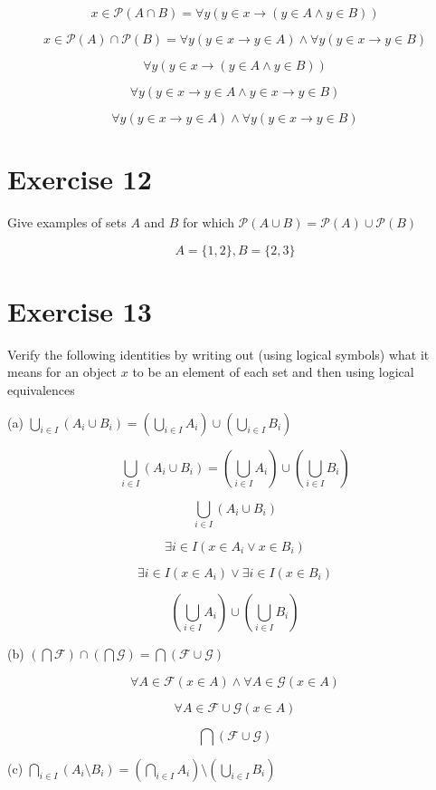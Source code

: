 \documentclass[11pt]{article}
\newcommand{\then}{\rightarrow}
\newcommand{\powerset}[1]{\mathscr{P}(#1)}
\newcommand{\family}{\mathcal{F}}
\begin{document}
$$x \in \powerset{A \cap B} = \forall y (y \in x \then (y \in A \wedge y \in B))$$

$$x \in \powerset{A} \cap \powerset{B} = 
\forall y (y \in x \then y \in A) \wedge \forall y (y \in x \then y \in B)$$

$$\forall y (y \in x \then (y \in A \wedge y \in B))$$

$$\forall y (y \in x \then y \in A \wedge y \in x \then y \in B)$$

$$\forall y (y \in x \then y \in A) \wedge \forall y (y \in x \then y \in B)$$

\section*{Exercise 12} 

Give examples of sets $A$ and $B$ for which 
$\powerset{A \cup B} = \powerset{A} \cup \powerset{B}$

$$A = \{1, 2\}, B = \{2 ,3\}$$

\section*{Exercise 13}

Verify the following identities by writing out (using logical symbols) what it 
means for an object $x$ to be an element of each set and then using logical 
equivalences

\noindent (a) $\bigcup_{i \in I} (A_i \cup B_i) = 
(\bigcup_{i \in I} A_i) \cup (\bigcup_{i \in I} B_i)$

$$\bigcup_{i \in I} (A_i \cup B_i) = 
(\bigcup_{i \in I} A_i) \cup (\bigcup_{i \in I} B_i)$$

$$\bigcup_{i \in I} (A_i \cup B_i)$$

$$\exists i \in I (x \in A_i \vee x \in B_i)$$

$$\exists i \in I (x \in A_i) \vee \exists i \in I (x \in B_i)$$

$$(\bigcup_{i \in I} A_i) \cup (\bigcup_{i \in I} B_i)$$

\noindent (b) $(\bigcap \family) \cap (\bigcap \mathcal{G}) = 
\bigcap (\family \cup \mathcal{G})$

$$\forall A \in \family (x \in A) \wedge \forall A \in \mathcal{G} (x \in A)$$

$$\forall A \in \family \cup \mathcal{G} (x \in A)$$

$$\bigcap (\family \cup \mathcal{G})$$

\noindent (c) $\bigcap_{i \in I} (A_i \setminus B_i) = 
(\bigcap_{i \in I} A_i) \setminus (\bigcup_{i \in I} B_i)$
\end{document}
